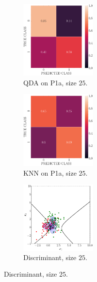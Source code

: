\documentclass[11pt, a4 paper]{article}
\begin{document}
\begin{figure}[!htbp]
\quad    
    \begin{subfigure}[!htbp]{0.24\textwidth}
       \centering
       \includegraphics[width=1.5in]{../results/ex1/conf_mtx_QD_ML_dataset_P1a_size_25.pdf}
       \caption{QDA on P1a, size $25$.}
       \label{fig:QDA_P1a_25}
    \end{subfigure}
\quad    
    \begin{subfigure}[!htbp]{0.24\textwidth}
       \centering
       \includegraphics[width=1.5in]{../results/ex1/conf_mtx_KNN_dataset_P1a_size_25.pdf}
       \caption{KNN on P1a, size $25$.}
       \label{fig:KNN_P1a_25}
    \end{subfigure}
\quad
    \begin{subfigure}[!htbp]{0.24\textwidth}
       \centering
       \includegraphics[width=1.5in]{../results/ex1/samples_QD_ML_dataset_P1a_size_25.pdf}
       \caption{Discriminant, size $25$.}
       \label{fig:DF_P1a_25}
    \end{subfigure}
    

\end{figure}
\end{document}
